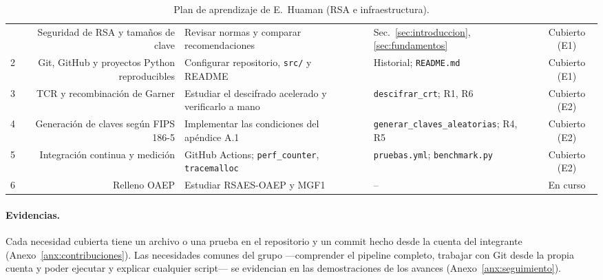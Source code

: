 \begin{table}[H]
\centering\footnotesize
\caption{Plan de aprendizaje de E.~Huaman (RSA e infraestructura).}
\begin{tabularx}{\textwidth}{@{}c N Y F V S@{}}
 & Seguridad de RSA y tamaños de clave & Revisar normas y comparar recomendaciones & \cite{nist80057,rfc8017} & Sec.~\ref{sec:introduccion}, \ref{sec:fundamentos} & Cubierto (E1)\\
2 & Git, GitHub y proyectos Python reproducibles & Configurar repositorio, \texttt{src/} y README & \cite{progit,pypa} & Historial; \texttt{README.md} & Cubierto (E1)\\
3 & TCR y recombinación de Garner & Estudiar el descifrado acelerado y verificarlo a mano & \cite{qc1982,hac} & \texttt{descifrar\_crt}; R1, R6 & Cubierto (E2)\\
4 & Generación de claves según FIPS 186-5 & Implementar las condiciones del apéndice A.1 & \cite{fips186} & \texttt{generar\_claves\_\allowbreak aleatorias}; R4, R5 & Cubierto (E2)\\
5 & Integración continua y medición & GitHub Actions; \texttt{perf\_counter}, \texttt{tracemalloc} & \cite{pydocs} & \texttt{pruebas.yml}; \texttt{benchmark.py} & Cubierto (E2)\\
6 & Relleno OAEP & Estudiar RSAES-OAEP y MGF1 & \cite{rfc8017} & -- & En curso\\
\bottomrule
\end{tabularx}
\end{table}

\paragraph{Evidencias.} Cada necesidad cubierta tiene un archivo o una prueba
en el repositorio y un commit hecho desde la cuenta del integrante
(Anexo~\ref{anx:contribuciones}). Las necesidades comunes del grupo
---comprender el pipeline completo, trabajar con Git desde la propia cuenta y
poder ejecutar y explicar cualquier script--- se evidencian en las
demostraciones de los avances (Anexo~\ref{anx:seguimiento}).

